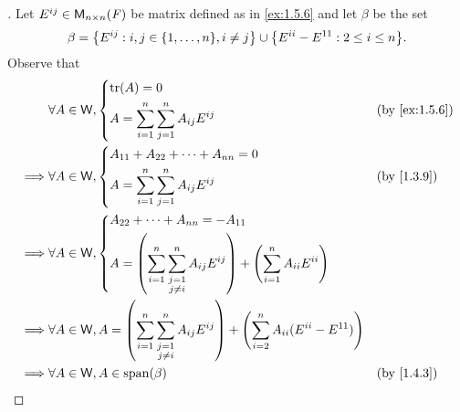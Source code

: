 \begin{proof}[]
  Let \(E^{i j} \in \ms[n][n][\F]\) be matrix defined as in \cref{ex:1.5.6} and let \(\beta\) be the set
  \[
    \beta = \set{E^{i j} : i, j \in \set{1, \dots, n}, i \neq j} \cup \set{E^{i i} - E^{1 1} : 2 \leq i \leq n}.
  \]
  Observe that
  \begin{align*}
             & \forall A \in \W, \begin{dcases}
                                   \tr[A] = 0 \\
                                   A = \sum_{i = 1}^n \sum_{j = 1}^n A_{i j} E^{i j}
                                 \end{dcases}                                                                                                                                                                         &  & \by{ex:1.5.6}                  \\
    \implies & \forall A \in \W, \begin{dcases}
                                   A_{1 1} + A_{2 2} + \cdots + A_{n n} = 0 \\
                                   A = \sum_{i = 1}^n \sum_{j = 1}^n A_{i j} E^{i j}
                                 \end{dcases}                                                                                                                                                                         &  & \by{1.3.9}                     \\
    \implies & \forall A \in \W, \begin{dcases}
                                   A_{2 2} + \cdots + A_{n n} = -A_{1 1}        \\
                                   A = \pa{\sum_{i = 1}^n \sum_{\substack{j = 1 \\ j \neq i}}^n A_{i j} E^{i j}} + \pa{\sum_{i = 1}^n A_{i i} E^{i i}}
                                 \end{dcases} \\
    \implies & \forall A \in \W, A = \pa{\sum_{i = 1}^n \sum_{\substack{j = 1                                                                                                                                                                             \\ j \neq i}}^n A_{i j} E^{i j}} + \pa{\sum_{i = 2}^n A_{i i} (E^{i i} - E^{1 1})} \\
    \implies & \forall A \in \W, A \in \spn{\beta}                                                                                                                                                                                       &  & \by{1.4.3}  \\

\end{align*}
\end{proof}
